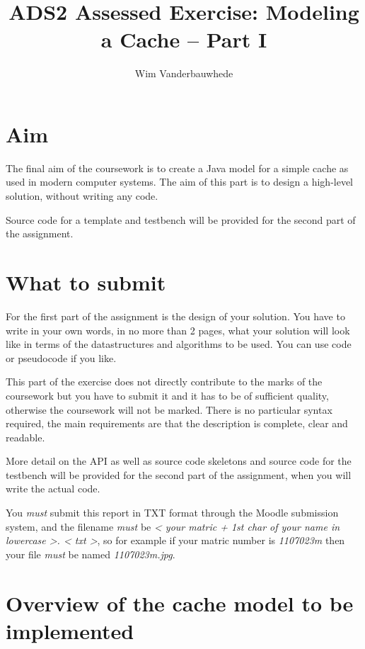 \documentclass[11pt]{article}
\title{ADS2 Assessed Exercise: Modeling a Cache -- Part I}
\author{Wim Vanderbauwhede}
\date{\vspace{-5ex}}                                           %
\begin{document}
\maketitle


\section{Aim}\label{aim}

The final aim of the coursework is to create a Java model for a simple cache as used in modern computer systems. The aim of this part is to design a high-level solution, without writing any code.

Source code for a template and  testbench will be provided for the second part of the assignment.

\section{What to submit}\label{what-to-submit}

For the first part of the assignment is the design of your solution. You have to write in your own words, in no more than 2 pages, what your solution will look like in terms of the datastructures and algorithms to be used. You can use code or pseudocode if you like.
 
This part of the exercise does not directly contribute to the marks of the coursework but you have to submit it and it has to be of sufficient quality, otherwise the coursework will not be marked. There is no particular syntax required, the main requirements are that the description is complete, clear and readable. 

More detail on the API as well as source code skeletons and source code for the testbench will be provided for the second part of the assignment, when you will write the actual code.

You \emph{must} submit this report  in TXT format through the
Moodle submission system, and the filename \emph{must} be
\emph{\textless{} your matric + 1st char of your name in lowercase
\textgreater{}. \textless{} txt \textgreater{}}, so for example
if your matric number is \emph{1107023m} then your file \emph{must} be
named \emph{1107023m.jpg}.

\section{Overview of the cache model to be implemented}\label{overview-of-the-cache}
\end{document}
